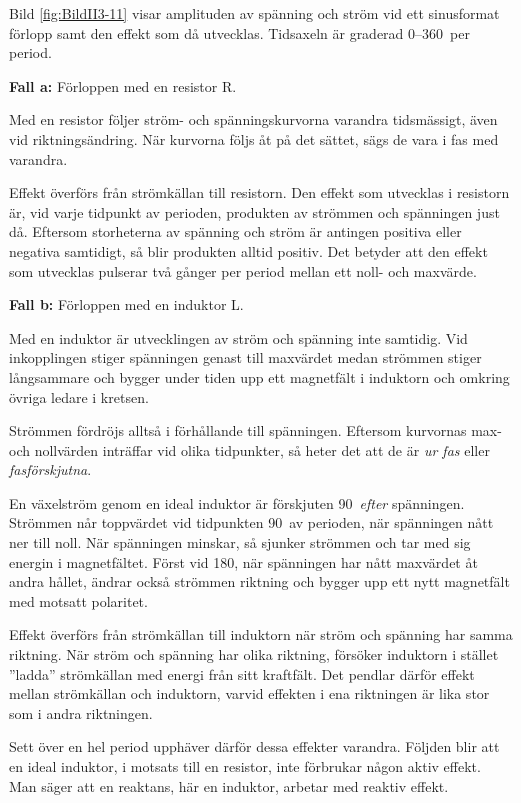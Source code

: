 Bild \ref{fig:BildII3-11} visar amplituden av spänning och ström vid ett
sinusformat förlopp samt den effekt som då utvecklas.
Tidsaxeln är graderad 0--360\degree~per period.

\textbf{Fall a:} Förloppen med en resistor R.

Med en resistor följer ström- och spänningskurvorna varandra tidsmässigt, även
vid riktningsändring.
När kurvorna följs åt på det sättet, sägs de vara i fas med varandra.

Effekt överförs från strömkällan till resistorn.
Den effekt som utvecklas i resistorn är, vid varje tidpunkt av perioden,
produkten av strömmen och spänningen just då.
Eftersom storheterna av spänning och ström är antingen positiva eller negativa
samtidigt, så blir produkten alltid positiv.
Det betyder att den effekt som utvecklas pulserar två gånger per period mellan
ett noll- och maxvärde.

\textbf{Fall b:} Förloppen med en induktor L.

Med en induktor är utvecklingen av ström och spänning inte samtidig.
Vid inkopplingen stiger spänningen genast till maxvärdet medan strömmen stiger
långsammare och bygger under tiden upp ett magnetfält i induktorn och omkring
övriga ledare i kretsen.

Strömmen fördröjs alltså i förhållande till spänningen.
Eftersom kurvornas max- och nollvärden inträffar vid olika tidpunkter, så heter
det att de är \emph{ur fas} eller \emph{fasförskjutna}.

En växelström genom en ideal induktor är förskjuten 90\degree~\emph{efter}
spänningen.
Strömmen når toppvärdet vid tidpunkten 90\degree~av perioden, när spänningen
nått ner till noll.
När spänningen minskar, så sjunker strömmen och tar med sig energin i
magnetfältet.
Först vid 180\degree, när spänningen har nått maxvärdet åt andra hållet, ändrar
också strömmen riktning och bygger upp ett nytt magnetfält med motsatt
polaritet.

Effekt överförs från strömkällan till induktorn när ström och spänning har samma
riktning.
När ström och spänning har olika riktning, försöker induktorn i stället
''ladda'' strömkällan med energi från sitt kraftfält.
Det pendlar därför effekt mellan strömkällan och induktorn, varvid effekten i
ena riktningen är lika stor som i andra riktningen.

Sett över en hel period upphäver därför dessa effekter varandra.
Följden blir att en ideal induktor, i motsats till en resistor, inte förbrukar
någon aktiv effekt.
Man säger att en reaktans, här en induktor, arbetar med reaktiv effekt.

